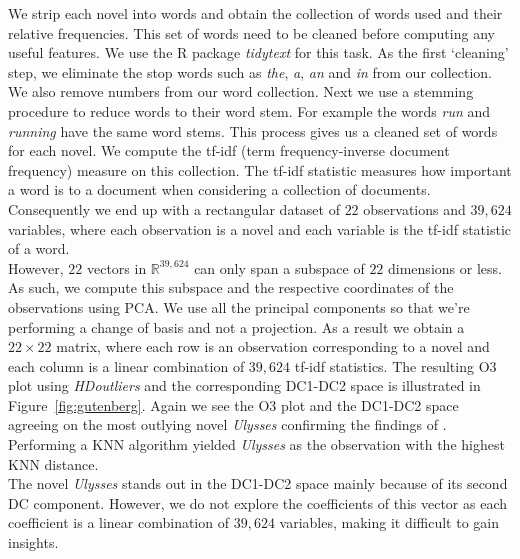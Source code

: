\documentclass[11pt]{article}
\begin{document}
We strip each novel into words and obtain the collection of words used and their relative frequencies. This set of words need to be cleaned before computing any useful features. We use the R package \textit{tidytext} \citep{tidytext} for this task. As the first `cleaning' step, we eliminate the stop words such as \textit{the}, \textit{a}, \textit{an} and \textit{in} from our collection. We also remove numbers from our word collection.  Next we use a stemming procedure to reduce words to their word stem. For example the words \textit{run} and \textit{running} have the same word stems. This process gives us a cleaned set of words for each novel. We compute the tf-idf (term frequency-inverse document frequency) measure on this collection. The tf-idf statistic measures how important a word is to a document when considering a collection of documents.  Consequently we end up with a rectangular dataset of $22$ observations and $39,624$ variables, where each observation is a novel and each variable is the tf-idf statistic of a word. \\

However, $22$ vectors in $\mathbb{R}^{39,624}$ can only span a subspace of $22$ dimensions or less. As such, we compute this subspace and the respective coordinates of the observations using PCA. We use all the principal components so that we're  performing a change of basis and not a projection. As a result we obtain a $22\times 22$ matrix, where each row is an observation corresponding to a novel and each column is a linear combination of $39,624$ tf-idf statistics. The resulting O3 plot using \textit{HDoutliers} and the corresponding DC1-DC2 space is illustrated in Figure~\ref{fig:gutenberg}. Again we see the O3 plot and the DC1-DC2 space agreeing on the most outlying novel \textit{Ulysses} confirming the findings of \cite{wilkinson2017visualizing}. Performing a KNN algorithm yielded \textit{Ulysses} as the observation with the highest KNN distance.  \\

The novel \textit{Ulysses} stands out in the DC1-DC2 space mainly because of its second DC component. However, we do not explore the coefficients of this vector as each coefficient is a linear combination of  $39,624$ variables, making it difficult to gain insights. \\
\end{document}
